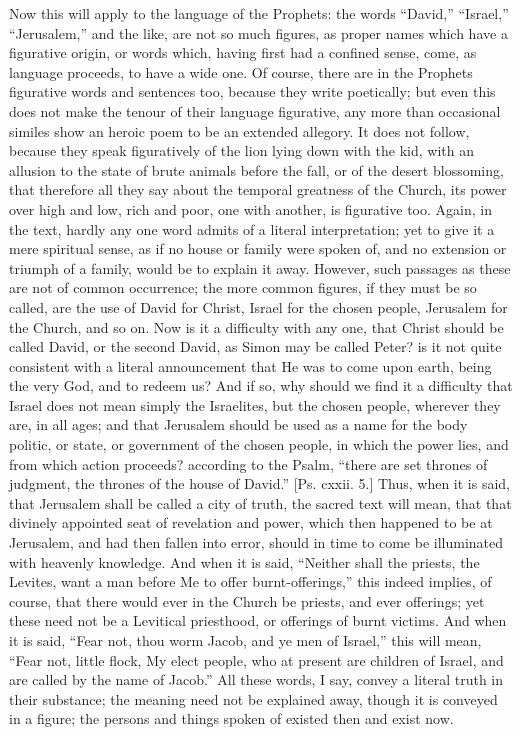Now this will apply to the language of the Prophets: the words
``David,'' ``Israel,'' ``Jerusalem,'' and the
like, are not so much figures, as proper names which have a figurative
origin, or words which, having first had a confined sense, come, as
language proceeds, to have a wide one. Of course, there are in the
Prophets figurative words and sentences too, because they write
poetically; but even this does not make the tenour of their language
figurative, any more than occasional similes show an heroic poem to be
an extended allegory. It does not follow, because they speak
figuratively of the lion lying down with the kid, with an allusion to
the state of brute animals before the fall, or of the desert
blossoming, that therefore all they say about the temporal greatness
of the Church, its power over high and low, rich and poor, one with
another, is figurative too. Again, in the text, hardly any one word
admits of a literal interpretation; yet to give it a mere spiritual
sense, as if no house or family were spoken of, and no extension or
triumph of a family, would be to explain it away. However, such
passages as these are not of common occurrence; the more common
figures, if they must be so called, are the use of David for Christ,
Israel for the chosen people, Jerusalem for the Church, and so on. Now
is it a difficulty with any one, that Christ should be called David,
or the second David, as Simon may be called Peter? is it not quite
consistent with a literal announcement that He was to come upon earth,
being the very God, and to redeem us? And if so, why should we find it
a difficulty that Israel does not mean simply the Israelites, but the
chosen people, wherever they are, in all ages; and that Jerusalem
should be used as a name for the body politic, or state, or government
of the chosen people, in which the power lies, and from which action
proceeds? according to the Psalm, ``there are set thrones of
judgment, the thrones of the house of David.'' [Ps. cxxii. 5.]
Thus, when it is said, that Jerusalem shall be called a city of truth,
the sacred text will mean, that that divinely appointed seat of
revelation and power, which then happened to be at Jerusalem, and had
then fallen into error, should in time to come be illuminated with
heavenly knowledge. And when it is said, ``Neither shall the
priests, the Levites, want a man before Me to offer
burnt-offerings,'' this indeed implies, of course, that there
would ever in the Church be priests, and ever offerings; yet these
need not be a Levitical priesthood, or offerings of burnt victims. And
when it is said, ``Fear not, thou worm Jacob, and ye men of
Israel,'' this will mean, ``Fear not, little flock, My elect
people, who at present are children of Israel, and are called by the
name of Jacob.'' All these words, I say, convey a literal truth in
their substance; the meaning need not be explained away, though it is
conveyed in a figure; the persons and things spoken of existed then
and exist now.

